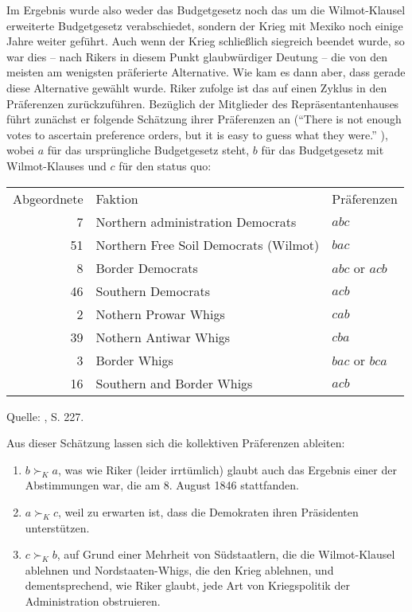 Im Ergebnis wurde also weder das Budgetgesetz noch das um die Wilmot-Klausel
erweiterte Budgetgesetz verabschiedet, sondern der Krieg mit Mexiko noch einige
Jahre weiter geführt. Auch wenn der Krieg schließlich siegreich beendet wurde,
so war dies -- nach Rikers in diesem Punkt glaubwürdiger Deutung -- die von
den meisten am wenigsten präferierte Alternative. Wie kam es dann aber, dass
gerade diese Alternative gewählt wurde. Riker zufolge ist das auf einen Zyklus
in den Präferenzen zurückzuführen. Bezüglich der Mitglieder des
Repräsentantenhauses führt zunächst er folgende Schätzung ihrer Präferenzen an
(``There is not enough votes to ascertain preference orders, but it is easy to
guess what they were.'' \cite[S. 227]{riker:1982}), wobei $a$ für das
ursprüngliche Budgetgesetz steht, $b$ für das Budgetgesetz mit Wilmot-Klauses 
und $c$ für den status quo:

\begin{center}
\begin{tabular}{rll}
Abgeordnete & Faktion & Präferenzen \\ \cline{1-3}
7  & Northern administration Democrats     & $abc$ \\
51 & Northern Free Soil Democrats (Wilmot) & $bac$ \\
8  & Border Democrats                      & $abc$ or $acb$ \\
46 & Southern Democrats                    & $acb$ \\
2  & Nothern Prowar Whigs                  & $cab$ \\
39 & Nothern Antiwar Whigs                 & $cba$ \\
3  & Border Whigs                          & $bac$ or $bca$ \\
16 & Southern and Border Whigs             & $acb$ \\ \cline{1-3}
\end{tabular}
Quelle: \cite{riker:1982}, S. 227.
\end{center}

Aus dieser Schätzung lassen sich die kollektiven Präferenzen ableiten:
\begin{enumerate}
  \item $b \succ_K a$, was wie Riker (leider irrtümlich) glaubt auch das
  Ergebnis einer der Abstimmungen war, die am 8. August 1846 stattfanden. 
  \item $a \succ_K c$, weil zu erwarten ist, dass die Demokraten ihren
  Präsidenten unterstützen.
  \item $c \succ_K b$, auf Grund einer Mehrheit von Südstaatlern, die die
  Wilmot-Klausel ablehnen und Nordstaaten-Whigs, die den Krieg ablehnen, und
  dementsprechend, wie Riker glaubt, jede Art von Kriegspolitik der
  Administration obstruieren.
\end{enumerate}

